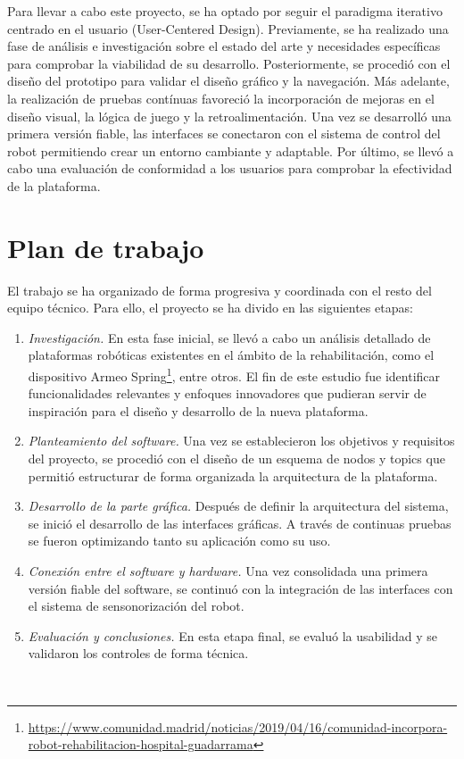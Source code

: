 Para llevar a cabo este proyecto, se ha optado por seguir el paradigma iterativo centrado en el usuario (User-Centered Design).
Previamente, se ha realizado una fase de análisis e investigación sobre el estado del arte y necesidades específicas para comprobar la viabilidad de su desarrollo.
Posteriormente, se procedió con el diseño del prototipo para validar el diseño gráfico y la navegación.
Más adelante, la realización de pruebas contínuas favoreció la incorporación de mejoras en el diseño visual, la lógica de juego y la retroalimentación.
Una vez se desarrolló una primera versión fiable, las interfaces se conectaron con el sistema de control del robot permitiendo crear un entorno cambiante y adaptable.
Por último, se llevó a cabo una evaluación de conformidad a los usuarios para comprobar la efectividad de la plataforma.

\section{Plan de trabajo}
\label{sec:plantrabajo}

El trabajo se ha organizado de forma progresiva y coordinada con el resto del equipo técnico.
Para ello, el proyecto se ha divido en las siguientes etapas:

\begin{enumerate}
    \item \textit{Investigación.} En esta fase inicial, se llevó a cabo un análisis detallado de plataformas robóticas existentes en el ámbito de la rehabilitación, como el dispositivo Armeo Spring\footnote{\url{https://www.comunidad.madrid/noticias/2019/04/16/comunidad-incorpora-robot-rehabilitacion-hospital-guadarrama}}, entre otros. El fin de este estudio fue identificar funcionalidades relevantes y enfoques innovadores que pudieran servir de inspiración para el diseño y desarrollo de la nueva plataforma.
    \item \textit{Planteamiento del software.} Una vez se establecieron los objetivos y requisitos del proyecto, se procedió con el diseño de un esquema de nodos y topics que permitió estructurar de forma organizada la arquitectura de la plataforma.
    \item \textit{Desarrollo de la parte gráfica.} Después de definir la arquitectura del sistema, se inició el desarrollo de las interfaces gráficas. A través de continuas pruebas se fueron optimizando tanto su aplicación como su uso.
    \item \textit{Conexión entre el software y hardware.} Una vez consolidada una primera versión fiable del software, se continuó con la integración de las interfaces con el sistema de sensonorización del robot.
    \item \textit{Evaluación y conclusiones.} En esta etapa final, se evaluó la usabilidad y se validaron los controles de forma técnica.
\end{enumerate}\

